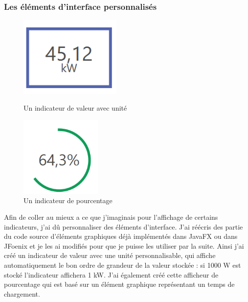 \subsubsection{Les éléments d'interface personnalisés}
\begin{figure}[h!]
	\begin{minipage}{0.48\textwidth}
		\centering
		\includegraphics[height=4cm]{partie2/images/customcontrol1.png}
		\caption{Un indicateur de valeur avec unité}
	\end{minipage}\hfill
	\begin{minipage}{0.48\textwidth}
		\centering
		\includegraphics[height=4cm]{partie2/images/customcontrol2.png}
		\caption{Un indicateur de pourcentage}
	\end{minipage}\hfill
\end{figure}

Afin de coller au mieux a ce que j'imaginais pour l'affichage de certains indicateurs, j'ai dû personnaliser des éléments d'interface. J'ai réécris des partie du code source d'éléments graphiques déjà implémentés dans JavaFX ou dans JFoenix et je les ai modifiés pour que je puisse les utiliser par la suite. Ainsi j'ai créé un indicateur de valeur avec une unité personnalisable, qui affiche automatiquement le bon ordre de grandeur de la valeur stockée : si 1000 W est stocké l'indicateur affichera 1 kW. J'ai également créé cette afficheur de pourcentage qui est basé sur un élément graphique représentant un temps de chargement.\\

